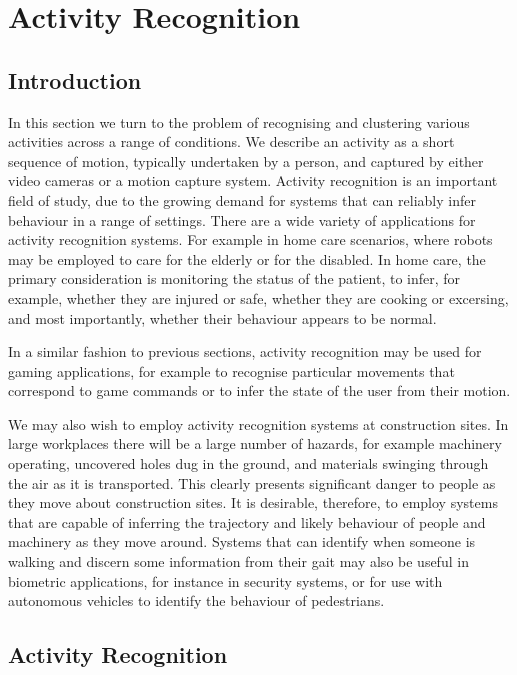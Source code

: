 \chapter{Activity Recognition}
\label{activityRecognition}

\section{Introduction}

In this section we turn to the problem of recognising and clustering various activities across a range of conditions. We describe an activity as a short sequence of motion, typically undertaken by a person, and captured by either video cameras or a motion capture system. Activity recognition is an important field of study, due to the growing demand for systems that can reliably infer behaviour in a range of settings. There are a wide variety of applications for activity recognition systems. For example in home care scenarios, where robots may be employed to care for the elderly or for the disabled. In home care, the primary consideration is monitoring the status of the patient, to infer, for example, whether they are injured or safe, whether they are cooking or excersing, and most importantly, whether their behaviour appears to be normal.

In a similar fashion to previous sections, activity recognition may be used for gaming applications, for example to recognise particular movements that correspond to game commands or to infer the state of the user from their motion. 

We may also wish to employ activity recognition systems at construction sites. In large workplaces there will be a large number of hazards, for example machinery operating, uncovered holes dug in the ground, and materials swinging through the air as it is transported. This clearly presents significant danger to people as they move about construction sites. It is desirable, therefore, to employ systems that are capable of inferring the trajectory and likely behaviour of people and machinery as they move around. Systems that can identify when someone is walking and discern some information from their gait may also be useful in biometric applications, for instance in security systems, or for use with autonomous vehicles to identify the behaviour of pedestrians.



\section{Activity Recognition}


